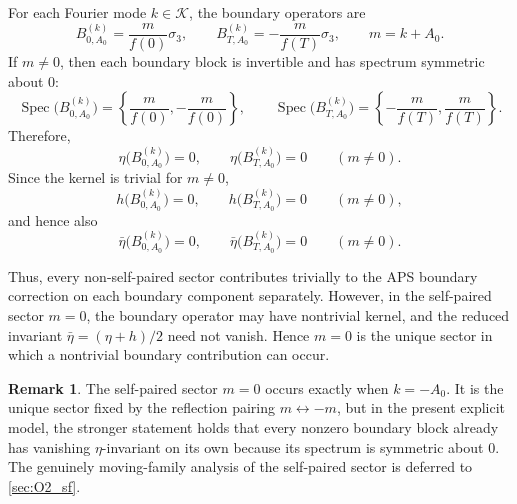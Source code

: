 \documentclass[11pt]{article}
\theoremstyle{definition}
\newtheorem{remark}[remark]{Remark}
\DeclareMathOperator{\Spec}{Spec}
\numberwithin{equation}{section}
\begin{document}
For each Fourier mode \(k\in\mathcal K\), the boundary operators are
\begin{equation}\label{eq:sec4_fixed_eta_boundary_blocks}
B_{0,A_0}^{(k)}=\frac{m}{f(0)}\sigma_3,
\qquad
B_{T,A_0}^{(k)}=-\frac{m}{f(T)}\sigma_3,
\qquad
m=k+A_0.
\end{equation}
If \(m\neq 0\), then each boundary block is invertible and has spectrum symmetric about \(0\):
\begin{equation}\label{eq:sec4_fixed_eta_block_spectrum}
\Spec\bigl(B_{0,A_0}^{(k)}\bigr)
=
\left\{\frac{m}{f(0)},-\frac{m}{f(0)}\right\},
\qquad
\Spec\bigl(B_{T,A_0}^{(k)}\bigr)
=
\left\{-\frac{m}{f(T)},\frac{m}{f(T)}\right\}.
\end{equation}
Therefore,
\begin{equation}\label{eq:sec4_fixed_eta_sectorwise_zero}
\eta\!\bigl(B_{0,A_0}^{(k)}\bigr)=0,
\qquad
\eta\!\bigl(B_{T,A_0}^{(k)}\bigr)=0
\qquad (m\neq 0).
\end{equation}
Since the kernel is trivial for \(m\neq 0\),
\begin{equation}\label{eq:sec4_fixed_kernel_zero_nonwall}
h\!\bigl(B_{0,A_0}^{(k)}\bigr)=0,
\qquad
h\!\bigl(B_{T,A_0}^{(k)}\bigr)=0
\qquad (m\neq 0),
\end{equation}
and hence also
\begin{equation}\label{eq:sec4_fixed_reduced_eta_sectorwise_zero}
\bar\eta\!\bigl(B_{0,A_0}^{(k)}\bigr)=0,
\qquad
\bar\eta\!\bigl(B_{T,A_0}^{(k)}\bigr)=0
\qquad (m\neq 0).
\end{equation}

Thus, every non-self-paired sector contributes trivially to the APS boundary correction on each boundary component separately. However, in the self-paired sector \(m=0\), the boundary operator may have nontrivial kernel, and the reduced invariant
\(\bar\eta=(\eta+h)/2\) need not vanish. Hence \(m=0\) is the unique sector in which a nontrivial boundary contribution can occur.














\begin{remark}\label{rem:sec4_selfpaired_sector}
The self-paired sector \(m=0\) occurs exactly when \(k=-A_0\). It is the unique sector fixed by the reflection pairing \(m\leftrightarrow -m\), but in the present explicit model, the stronger statement holds that every nonzero boundary block already has vanishing \(\eta\)-invariant on its own because its spectrum is symmetric about \(0\). The genuinely moving-family analysis of the self-paired sector is deferred to \autoref{sec:O2_sf}.
\end{remark}
\end{document}
